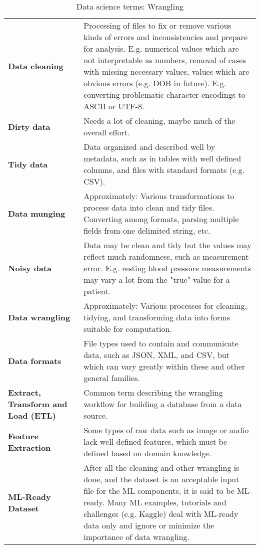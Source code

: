 \begin{appendices}
\begin{table}
\caption{Data science terms: Wrangling}
\begin{tabular}{p{0.3\linewidth}p{0.7\linewidth}}
\hline
\textbf{Data cleaning} & Processing of files to fix or remove various kinds of errors and inconsistencies and prepare for analysis.  E.g. numerical values which are
not interpretable as numbers, removal of cases with missing necessary values, values which are obvious errors (e.g. DOB in future).  E.g. converting problematic
character encodings to ASCII or UTF-8. \\
\textbf{Dirty data} & Needs a lot of cleaning, maybe much of the overall effort. \\
\textbf{Tidy data} & Data organized and described well by metadata, such as in tables with well defined columns, and files with standard formats (e.g. CSV). \\
\textbf{Data munging} & Approximately: Various transformations to process data into clean and tidy files.  Converting among formats, parsing multiple fields from
one delimited string, etc. \\
\textbf{Noisy data} & Data may be clean and tidy but the values may reflect much randomness, such as measurement error.  E.g. resting blood pressure measurements
may vary a lot from the "true" value for a patient. \\
\textbf{Data wrangling} & Approximately: Various processes for cleaning, tidying, and transforming data into forms suitable for computation. \\
\textbf{Data formats} & File types used to contain and communicate data, such as JSON, XML, and CSV, but which can vary greatly within these and other general
families. \\
\textbf{Extract, Transform and Load (ETL)} & Common term describing the wrangling workflow for building a database from a data source. \\
\textbf{Feature Extraction} & Some types of raw data such as image or audio lack well defined features, which must be defined based on domain knowledge. \\
\textbf{ML-Ready Dataset} & After all the cleaning and other wrangling is done, and the dataset is an acceptable input file for the ML components, it is said to be
ML-ready.  Many ML examples, tutorials and challenges (e.g. Kaggle) deal with ML-ready data only and ignore or minimize the importance of data wrangling. \\
\hline
\end{tabular}
\end{table}


\end{appendices}
